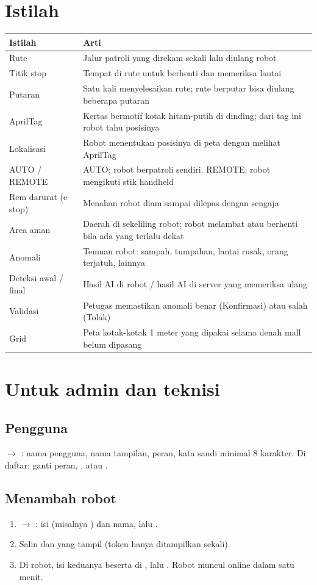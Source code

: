 \documentclass[11pt]{article}
\newcommand{\ra}{\ensuremath{\rightarrow}}
\begin{document}
\section{Istilah}
\begin{tabularx}{\linewidth}{@{}B{3.6cm}Y@{}}
\toprule
Istilah & Arti \\
\midrule
Rute & Jalur patroli yang direkam sekali lalu diulang robot \\
Titik stop & Tempat di rute untuk berhenti dan memeriksa lantai \\
Putaran & Satu kali menyelesaikan rute; rute berputar bisa diulang beberapa putaran \\
AprilTag & Kertas bermotif kotak hitam-putih di dinding; dari tag ini robot tahu posisinya \\
Lokalisasi & Robot menentukan posisinya di peta dengan melihat AprilTag \\
AUTO / REMOTE & AUTO: robot berpatroli sendiri. REMOTE: robot mengikuti stik handheld \\
Rem darurat (e-stop) & Menahan robot diam sampai dilepas dengan sengaja \\
Area aman & Daerah di sekeliling robot; robot melambat atau berhenti bila ada yang terlalu dekat \\
Anomali & Temuan robot: sampah, tumpahan, lantai rusak, orang terjatuh, lainnya \\
Deteksi awal / final & Hasil AI di robot / hasil AI di server yang memeriksa ulang \\
Validasi & Petugas memastikan anomali benar (Konfirmasi) atau salah (Tolak) \\
Grid & Peta kotak-kotak 1 meter yang dipakai selama denah mall belum dipasang \\
\bottomrule
\end{tabularx}

\clearpage
\section{Untuk admin dan teknisi}
\subsection*{Pengguna}
 \ra{} : nama pengguna, nama tampilan, peran, kata sandi minimal
8 karakter. Di daftar: ganti peran, ,  atau .

\subsection*{Menambah robot}
\begin{enumerate}
  \item {} \ra{} : isi  (misalnya ) dan nama, lalu
        .
  \item Salin  dan  yang tampil (token hanya ditampilkan sekali).
  \item Di robot, isi keduanya beserta  di , lalu
        . Robot muncul online dalam satu menit.
\end{enumerate}
\end{document}
